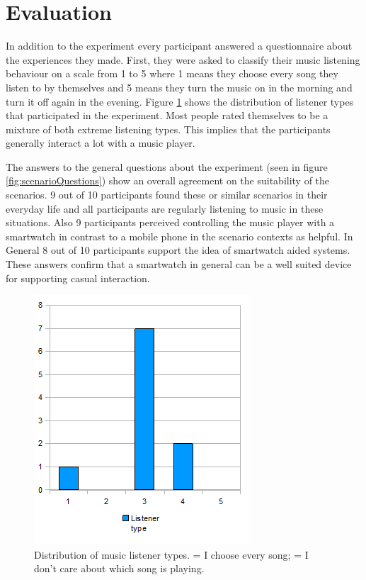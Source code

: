 \section{Evaluation}\label{sec:studyResults}
In addition to the experiment every participant answered a questionnaire about the experiences they made. First, they were asked to classify their music listening behaviour on a scale from 1 to 5 where 1 means they choose every song they listen to by themselves and 5 means they turn the music on in the morning and turn it off again in the evening. Figure \ref{fig:listenerTypes} shows the distribution of listener types that participated in the experiment. Most people rated themselves to be a mixture of both extreme listening types. This implies that the participants generally interact a lot with a music player.

The answers to the general questions about the experiment (seen in figure \ref{fig:scenarioQuestions}) show an overall agreement on the suitability of the scenarios. 9 out of 10 participants found these or similar scenarios in their everyday life and all participants are regularly listening to music in these situations. Also 9 participants perceived controlling the music player with a smartwatch in contrast to a mobile phone in the scenario contexts as helpful. In General 8 out of 10 participants support the idea of smartwatch aided systems. These answers confirm that a smartwatch in general can be a well suited device for supporting casual interaction.

\begin{figure}[h]
	\myfloatalign
	\includegraphics[width=.5\linewidth]{img/listenerTypesPlot.png}
	\caption{Distribution of music listener types.  = I choose every song;  = I don't care about which song is playing.}
	\label{fig:listenerTypes}
\end{figure}

